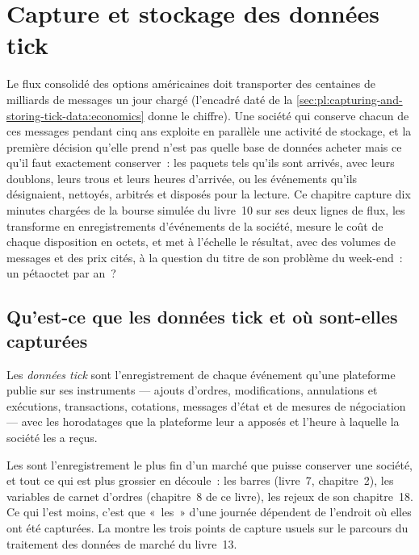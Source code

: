 \chapter{Capture et stockage des données tick}\label{ch:pl:capturing-and-storing-tick-data}

Le flux consolidé des options américaines doit transporter des centaines de milliards de messages un jour chargé (l'encadré daté de
la \cref{sec:pl:capturing-and-storing-tick-data:economics} donne le chiffre). Une société qui conserve chacun de ces messages pendant
cinq ans exploite en parallèle une activité de stockage, et la première décision qu'elle prend n'est pas quelle base de données acheter mais
ce qu'il faut exactement conserver~: les paquets tels qu'ils sont arrivés, avec leurs doublons, leurs trous et leurs heures d'arrivée,
ou les événements qu'ils désignaient, nettoyés, arbitrés et disposés pour la lecture. Ce chapitre capture dix minutes chargées de la
bourse simulée du livre~10 sur ses deux lignes de flux, les transforme en enregistrements d'événements de la société, mesure le coût de chaque disposition en octets, et met à l'échelle le
résultat, avec des volumes de messages et des prix cités, à la question du titre de son problème du week-end~: un pétaoctet par an~?

\section{Qu'est-ce que les données tick et où sont-elles capturées}

\begin{definition}\label{def:pl:capturing-and-storing-tick-data:tick}
Les \emph{données tick} sont l'enregistrement de chaque événement qu'une plateforme publie sur ses instruments --- ajouts
d'ordres, modifications, annulations et exécutions, transactions, cotations, messages d'état et de mesures de négociation --- avec les horodatages que
la plateforme leur a apposés et l'heure à laquelle la société les a reçus.
\end{definition}

Les  sont l'enregistrement le plus fin d'un marché que puisse conserver une société, et tout ce qui est plus grossier en
découle~: les barres (livre~7, chapitre~2), les variables de carnet d'ordres (chapitre~8 de ce livre), les rejeux de son chapitre~18. Ce qui l'est moins, c'est que «~les~»
 d'une journée dépendent de l'endroit où elles ont été capturées. La  montre les trois
points de capture usuels sur le parcours du traitement des données de marché du livre~13.

